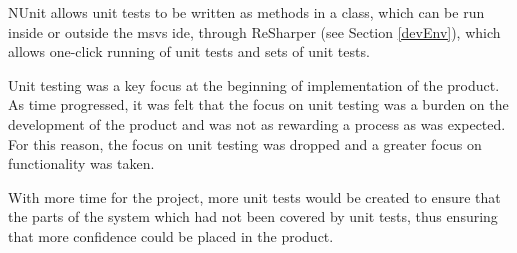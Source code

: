 NUnit allows unit tests to be written as methods in a class, which can be run inside or outside the \gls{msvs} \gls{ide}, through ReSharper (see Section \ref{devEnv}), which allows one-click running of unit tests and sets of unit tests.

Unit testing was a key focus at the beginning of implementation of the product.  As time progressed, it was felt that the focus on unit testing was a burden on the development of the product and was not as rewarding a process as was expected.  For this reason, the focus on unit testing was dropped and a greater focus on functionality was taken.

With more time for the project, more unit tests would be created to ensure that the parts of the system which had not been covered by unit tests, thus ensuring that more confidence could be placed in the product.

